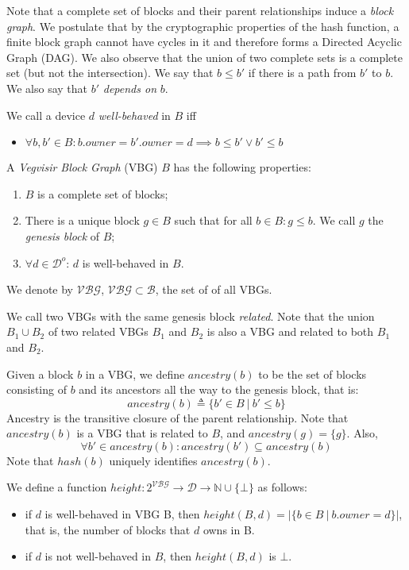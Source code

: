 \documentclass{article}
\begin{document}
Note that a complete set of blocks and their parent relationships induce a \emph{block graph}.
We postulate that by the cryptographic properties of the hash function,
a finite block graph cannot have cycles in it and therefore forms a Directed Acyclic Graph (DAG).
We also observe that the union of two complete sets is a complete set (but not the intersection).
We say that $b \leq b'$ if there is a path from $b'$ to $b$.
We also say that $b'$ \emph{depends on} $b$.

We call a device $d$ \emph{well-behaved} in $B$ iff
\begin{itemize}
\item $\forall b, b' \in B: b.\mathit{owner} = b'.\mathit{owner} = d \implies b \leq b' \vee b' \leq b$
\end{itemize}

A \emph{Vegvisir Block Graph} (VBG) $B$ has the following properties:
\begin{enumerate}
\item $B$ is a complete set of blocks;
\item There is a unique block $g \in B$ such that for all $b \in B: g \leq b$.  We call $g$ the \emph{genesis block} of $B$;
\item $\forall d \in \mathcal{D}^o$: $d$ is well-behaved in $B$.
\end{enumerate}
We denote by $\mathcal{VBG}$, $\mathcal{VBG} \subset \mathcal{B}$, the set of of all VBGs.

We call two VBGs with the same genesis block \emph{related}.
Note that the union $B_1 \cup B_2$ of two related VBGs $B_1$ and $B_2$ is also a VBG and
related to both $B_1$ and $B_2$.

Given a block $b$ in a VBG, we define $\mathit{ancestry}(b)$
to be the set of blocks consisting of $b$ and its ancestors all the way to the genesis block, that is:
\begin{equation*}
\mathit{ancestry}(b) \triangleq \{ b' \in B ~|~ b' \leq b \}
\end{equation*}
Ancestry is the transitive closure of the parent relationship.
Note that $\mathit{ancestry}(b)$ is a VBG that is related to $B$, and
$\mathit{ancestry}(g) = \{ g \}$.  Also,
\begin{equation*}
\forall b' \in \mathit{ancestry}(b): \mathit{ancestry}(b') \subseteq \mathit{ancestry}(b)
\end{equation*}
Note that $\mathit{hash}(b)$ uniquely identifies $\mathit{ancestry}(b)$.

We define a function $\mathit{height} : 2^\mathcal{VBG} \rightarrow \mathcal{D} \rightarrow \mathbb{N} \cup \{ \bot \}$
as follows:
\begin{itemize}
\item if $d$ is well-behaved in VBG B, then $\mathit{height}(B, d) = |\{ b \in B ~|~ b.\textit{owner} = d \}|$, that is, the number of blocks that $d$ owns in B.
\item if $d$ is not well-behaved in $B$, then $\mathit{height}(B, d)$ is $\bot$.
\end{itemize}
\end{document}
